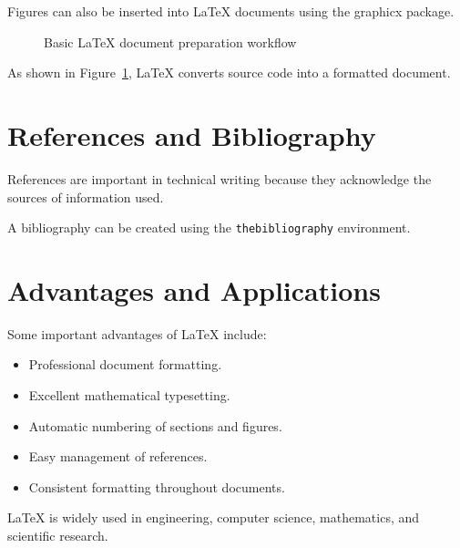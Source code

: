 \documentclass[12pt,a4paper]{article}
\begin{document}
Figures can also be inserted into LaTeX documents
using the graphicx package.

\begin{figure}[h]
\centering
{}
\caption{Basic LaTeX document preparation workflow}
\label{fig:workflow}
\end{figure}

As shown in Figure~\ref{fig:workflow}, LaTeX converts
source code into a formatted document.

\section{References and Bibliography}

References are important in technical writing because
they acknowledge the sources of information used.

A bibliography can be created using the
\texttt{thebibliography} environment.

\section{Advantages and Applications}

Some important advantages of LaTeX include:

\begin{itemize}
    \item Professional document formatting.
    \item Excellent mathematical typesetting.
    \item Automatic numbering of sections and figures.
    \item Easy management of references.
    \item Consistent formatting throughout documents.
\end{itemize}

LaTeX is widely used in engineering, computer science,
mathematics, and scientific research.
\end{document}
